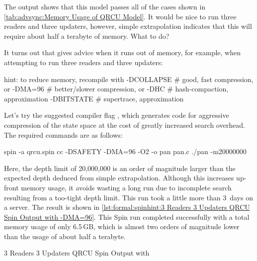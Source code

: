 The output shows that this model passes all of the cases shown in
\cref{tab:advsync:Memory Usage of QRCU Model}.
It would be nice to run three readers and three
updaters, however, simple extrapolation indicates that this will
require about half a terabyte of memory.
What to do?

It turns out that  gives advice when it runs out of memory,
for example, when attempting to run three readers and three updaters:

\begin{VerbatimU}
hint: to reduce memory, recompile with
  -DCOLLAPSE # good, fast compression, or
  -DMA=96   # better/slower compression, or
  -DHC # hash-compaction, approximation
  -DBITSTATE # supertrace, approximation
\end{VerbatimU}

Let's try the suggested compiler flag ,
which generates code for aggressive compression of the
state space at the cost of greatly increased search overhead.
The required commands are as follows:

\begin{VerbatimU}
spin -a qrcu.spin
cc -DSAFETY -DMA=96 -O2 -o pan pan.c
./pan -m20000000
\end{VerbatimU}

Here, the depth limit of 20,000,000 is an order of magnitude
larger than the expected depth deduced from simple extrapolation.
Although this increases up-front memory usage, it avoids wasting
a long run due to incomplete search resulting from a too-tight
depth limit.
This run took a little more than 3~days on a  server.
The result is shown in
\cref{lst:formal:spinhint:3 Readers 3 Updaters QRCU Spin Output with -DMA=96}.
This Spin run completed successfully with a total memory
usage of only 6.5\,GB, which is almost two orders of magnitude
lower than the  usage of about half a terabyte.

\begin{listing}
\vspace*{-9pt}
\caption{3 Readers 3 Updaters QRCU Spin Output with }
\label{lst:formal:spinhint:3 Readers 3 Updaters QRCU Spin Output with -DMA=96}
\end{listing}

